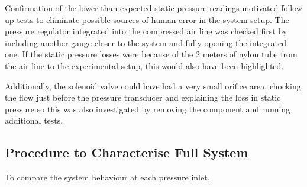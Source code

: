 Confirmation of the lower than expected static pressure readings motivated follow up tests to eliminate possible sources of human error in the system setup. The pressure regulator integrated into the compressed air line was checked first by including another gauge closer to the system and fully opening the integrated one. If the static pressure losses were because of the 2 meters of nylon tube from the air line to the experimental setup, this would also have been highlighted.

Additionally, the solenoid valve could have had a very small orifice area, chocking the flow just before the pressure transducer and explaining the loss in static pressure so this was also investigated by removing the component and running additional tests.

\subsection{Procedure to Characterise Full System}
To compare the system behaviour at each pressure inlet, 


